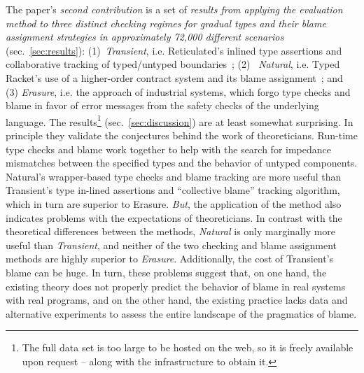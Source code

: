 The paper's {\it second contribution\/} is a set of {\em results from
applying the evaluation method to three distinct checking regimes for
gradual types and their blame assignment
strategies in approximately 72,000 different scenarios\/}
(sec.~\ref{sec:results}): (1)~{\it Transient\/}, i.e. Reticulated's
inlined type assertions and collaborative tracking of typed/untyped boundaries~\citep{vss-popl-2017}; (2)~{\it
Natural\/}, i.e. Typed Racket's use of a higher-order contract system and
its blame assignment~\citep{ff-icfp-2002}; and (3) {\it Erasure\/}, i.e.
the approach of industrial systems, which forgo type checks and blame in favor of error
messages from the safety checks of the underlying language. The results\footnote{The full data set is too large to be hosted on the web, so it is freely available upon request -- along with the infrastructure to obtain it.}
(sec.~\ref{sec:discussion}) are at least somewhat surprising.  In
principle they validate the conjectures behind the work of theoreticians.
Run-time type checks and blame work together to help with the search for
impedance mismatches between the specified types and the behavior of
untyped components.  Natural's wrapper-based type checks and blame tracking are
more useful than Transient's type in-lined assertions and ``collective blame'' tracking algorithm,
which in turn are superior to Erasure. {\em But\/}, the application of the
method also indicates problems with the expectations of theoreticians. 
In contrast with the theoretical differences between the methods,
{\it Natural\/} is only marginally more useful than {\it Transient\/}, and neither of the two
checking and blame assignment methods are highly superior to {\it Erasure\/}. Additionally, 
the cost of Transient's blame can be huge.  In turn, these
problems suggest that, on one hand, the existing theory does not properly
predict the behavior of blame in real systems with real programs,
and on the other hand, the existing practice lacks data and alternative
experiments to assess the entire landscape of the pragmatics of blame. 
